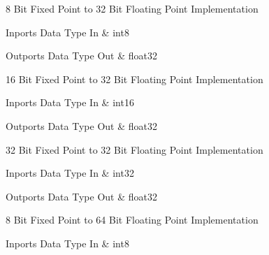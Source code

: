 \nopagebreak[0]

8 Bit Fixed Point to 32 Bit Floating Point Implementation

\begin{XtoCtabular}{Inports Data Type}
In & int8\tabularnewline
\hline
\end{XtoCtabular}

\begin{XtoCtabular}{Outports Data Type}
Out & float32\tabularnewline
\hline
\end{XtoCtabular}

\ifdefined \AddTestReports
{}
\fi
{}
\nopagebreak[0]

16 Bit Fixed Point to 32 Bit Floating Point Implementation

\begin{XtoCtabular}{Inports Data Type}
In & int16\tabularnewline
\hline
\end{XtoCtabular}

\begin{XtoCtabular}{Outports Data Type}
Out & float32\tabularnewline
\hline
\end{XtoCtabular}

\ifdefined \AddTestReports
{}
\fi
{}
\nopagebreak[0]

32 Bit Fixed Point to 32 Bit Floating Point Implementation

\begin{XtoCtabular}{Inports Data Type}
In & int32\tabularnewline
\hline
\end{XtoCtabular}

\begin{XtoCtabular}{Outports Data Type}
Out & float32\tabularnewline
\hline
\end{XtoCtabular}

\ifdefined \AddTestReports
{}
\fi
{}
\nopagebreak[0]

8 Bit Fixed Point to 64 Bit Floating Point Implementation

\begin{XtoCtabular}{Inports Data Type}
In & int8\tabularnewline
\hline
\end{XtoCtabular}

